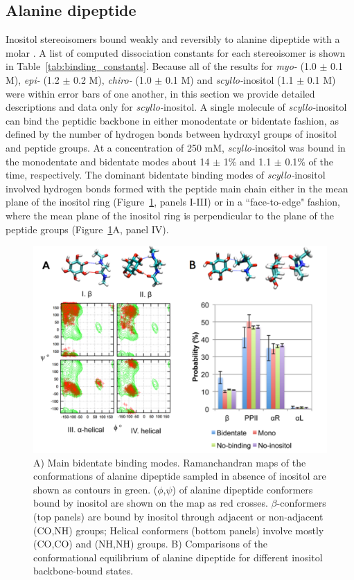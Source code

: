 \subsection{Alanine dipeptide}
Inositol stereoisomers bound weakly and reversibly to alanine dipeptide with a molar \KD. A list of computed dissociation constants for each stereoisomer is shown in Table~\ref{tab:binding_constants}. Because all of the results for \textit{myo-} (1.0 $\pm$ 0.1 M), \textit{epi-} (1.2 $\pm$ 0.2 M), \textit{chiro-} (1.0 $\pm$ 0.1 M) and \textit{scyllo-}inositol (1.1 $\pm$ 0.1 M) were within error bars of one another, in this section we provide detailed descriptions and data only for \textit{scyllo-}inositol. A single molecule of \textit{scyllo-}inositol can bind the peptidic backbone in either monodentate or bidentate fashion, as defined by the number of hydrogen bonds between hydroxyl groups of inositol and peptide groups. At a concentration of 250 mM, \textit{scyllo-}inositol was bound in the monodentate and bidentate modes about 14 $\pm$ 1\% and 1.1 $\pm$ 0.1\% of the time, respectively. The dominant bidentate binding modes of \textit{scyllo-}inositol involved hydrogen bonds formed with the peptide main chain either in the mean plane of the inositol ring (Figure~\ref{fig:figure2}, panels I-III) or in a ``face-to-edge" fashion, where the mean plane of the inositol ring is perpendicular to the plane of the peptide groups (Figure~\ref{fig:figure2}A, panel IV).
	
\begin{figure}[htbp]
    \centering
    \includegraphics[width=6in]{figures/results1/GA4_paper_figures_submitted-2-rearranged}
    \caption[Binding of \textit{scyllo-}inositol to the backbone of alanine dipeptide.]
     {A) Main bidentate binding modes. Ramanchandran maps of the conformations of alanine dipeptide sampled in absence of inositol are shown as contours in green. ($\phi$,$\psi$) of alanine dipeptide conformers bound by inositol are shown on the map as red crosses. $\beta$-conformers (top panels) are bound by inositol through adjacent or non-adjacent (CO,NH) groups; Helical conformers (bottom panels) involve mostly (CO,CO) and (NH,NH) groups. B) Comparisons of the conformational equilibrium of alanine dipeptide for different inositol backbone-bound states.}
     \label{fig:figure2}
  \end{figure}
  
